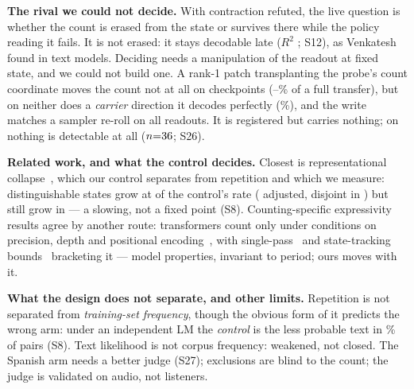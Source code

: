 %

\noindent\textbf{The rival we could not decide.}
With contraction refuted, the live question is whether the count is erased from
the state or survives there while the policy reading it fails. It is not erased:
it stays decodable late ($R^2$ \ProbeLateMed{}; S12), as
Venkatesh~\cite{venkatesh2026repeated} found in text models. Deciding needs a manipulation of the
readout at fixed state, and we could not build one. A rank-1 patch transplanting
the probe's count coordinate moves the count not at all on \CausalCkOk{}
checkpoints (\EqPatchQlgFrac{}--\EqPatchLsmFrac{}\% of a full transfer), but on
\ErrBestModel{} neither does a \emph{carrier} direction it decodes perfectly
(\PcCarrierBound{}\%), and the write matches a sampler re-roll on all
\PcRerollNTests{} readouts. It is registered but carries nothing; on \PcInertCk{}
nothing is detectable at all ($n{=}36{}$; S26).

\noindent\textbf{Related work, and what the control decides.}
Closest is representational collapse~\cite{barbero2024glasses}, which our control
separates from repetition and which we measure: distinguishable states grow at
\CapRatio{} of the control's rate (\CapAdjRatio{} adjusted, disjoint in
\CapSepPhrase{}) but still grow in \CapPosModels{} --- a slowing, not a fixed
point (S8).
Counting-specific expressivity results agree by another route: transformers
count only under conditions on precision, depth and positional
encoding~\cite{yehudai2024when,salzer2025counting,zhang2024counting}, with
single-pass~\cite{hahn2020theoretical,strobl2024formal} and state-tracking
bounds~\cite{li2025statetracking} bracketing it --- model properties, invariant
to period; ours moves with it.

\noindent\textbf{What the design does not separate, and other limits.}
Repetition is not separated from \emph{training-set frequency}, though the
obvious form of it predicts the wrong arm: under an independent LM the
\emph{control} is the less probable text in \NllIndCtlHigherPct{}\% of pairs
(S8). Text likelihood is not corpus frequency: weakened, not closed.
The Spanish arm needs a better judge (S27); exclusions are blind to the count;
the judge is validated on audio, not listeners.
